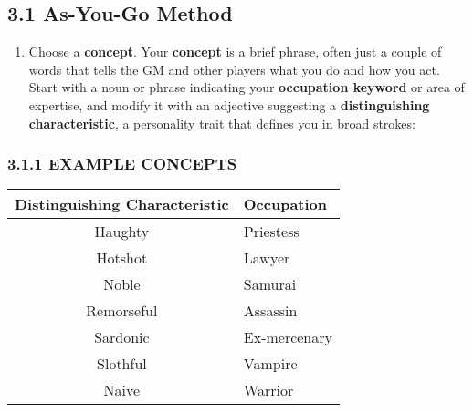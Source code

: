 \documentclass[
  11pt,
]{article}
\providecommand{\tightlist}{%
  \setlength{\itemsep}{0pt}\setlength{\parskip}{0pt}}
\begin{document}
\hypertarget{as-you-go-method}{%
\subsection{3.1 As-You-Go Method}\label{as-you-go-method}}

\begin{enumerate}
\def\labelenumi{\arabic{enumi}.}
\tightlist
\item
  Choose a \textbf{concept}. Your \textbf{concept} is a brief phrase,
  often just a couple of words that tells the GM and other players what
  you do and how you act. Start with a noun or phrase indicating your
  \textbf{occupation keyword} or area of expertise, and modify it with
  an adjective suggesting a \textbf{distinguishing characteristic}, a
  personality trait that defines you in broad strokes:
\end{enumerate}

\hypertarget{example-concepts}{%
\subsubsection{3.1.1 EXAMPLE CONCEPTS}\label{example-concepts}}

\begin{longtable}[]{@{}cl@{}}
\toprule
Distinguishing Characteristic & Occupation \\
\midrule
\endhead
Haughty & Priestess \\
Hotshot & Lawyer \\
Noble & Samurai \\
Remorseful & Assassin \\
Sardonic & Ex-mercenary \\
Slothful & Vampire \\
Naive & Warrior \\
\bottomrule
\end{longtable}
\end{document}
